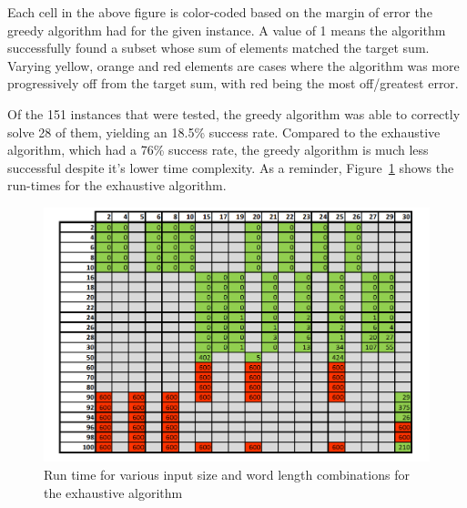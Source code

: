 \documentclass{article}
\begin{document}
Each cell in the above figure is color-coded based on the margin of error
the greedy algorithm had for the given instance. A value of 1 means the algorithm
successfully found a subset whose sum of elements matched the target sum. 
Varying yellow, orange and red elements are cases where the algorithm was more
progressively off from the target sum, with red being the most off/greatest error.

Of the 151 instances that were tested, the greedy algorithm was able to
correctly solve 28 of them, yielding an 18.5\% success rate. Compared to the
exhaustive algorithm, which had a 76\% success rate, the greedy algorithm 
is much less successful despite it's lower time complexity. As a reminder,
Figure~\ref{fig:exhaustive} shows the run-times for the exhaustive algorithm.

\begin{figure}[h]
\centering
\includegraphics[width=12cm]{P1_res.png}
\caption{Run time for various input size and word length combinations for the exhaustive algorithm}
\label{fig:exhaustive}
\end{figure}
\end{document}
